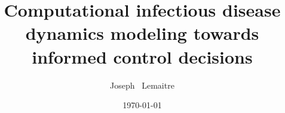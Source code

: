 \documentclass[nohyper,nobib,a4,12pt]{tufte-book} %
\title{Computational infectious disease dynamics modeling towards informed control decisions}
\date{\today}
\author[Joseph Lemaitre]{Joseph \ Lemaitre}
\newcommand{\openepigraph}[2]{%
  \begin{fullwidth}
  \sffamily\large
  \begin{doublespace}
  \noindent\allcaps{#1}\\%
  \noindent\allcaps{#2}%
  \end{doublespace}
  \end{fullwidth}
}
\newcommand{\blankpage}{\newpage\hbox{}\thispagestyle{empty}\newpage}
\begin{document}
	





\tableofcontents

\listoffigures

\listoftables








  







\begin{fullwidth}
\printbibliography
\end{fullwidth}
\end{document}
